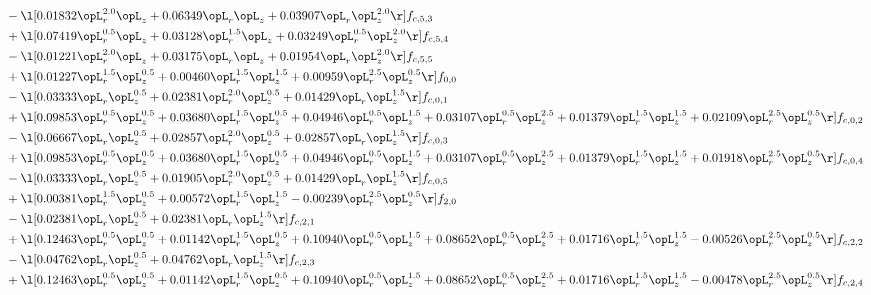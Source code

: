 \begin{alignat}{2}
& - \l[  0.01832 \opL_r^{2.0} \opL_z +  0.06349 \opL_r \opL_z +  0.03907 \opL_r \opL_z^{2.0}  \r] f_{c,5,3} \nonumber \\ 
& + \l[  0.07419 \opL_r^{0.5} \opL_z +  0.03128 \opL_r^{1.5} \opL_z +  0.03249 \opL_r^{0.5} \opL_z^{2.0}  \r] f_{c,5,4} \nonumber \\ 
& - \l[  0.01221 \opL_r^{2.0} \opL_z +  0.03175 \opL_r \opL_z +  0.01954 \opL_r \opL_z^{2.0}  \r] f_{c,5,5} \nonumber \\ 
& + \l[  0.01227 \opL_r^{1.5} \opL_z^{0.5} +  0.00460 \opL_r^{1.5} \opL_z^{1.5} +  0.00959 \opL_r^{2.5} \opL_z^{0.5}  \r] f_{0,0} \nonumber \\ 
& - \l[  0.03333 \opL_r \opL_z^{0.5} +  0.02381 \opL_r^{2.0} \opL_z^{0.5} +  0.01429 \opL_r \opL_z^{1.5}  \r] f_{c,0,1} \nonumber \\ 
& + \l[  0.09853 \opL_r^{0.5} \opL_z^{0.5} +  0.03680 \opL_r^{1.5} \opL_z^{0.5} +  0.04946 \opL_r^{0.5} \opL_z^{1.5} +  0.03107 \opL_r^{0.5} \opL_z^{2.5} +  0.01379 \opL_r^{1.5} \opL_z^{1.5} +  0.02109 \opL_r^{2.5} \opL_z^{0.5}  \r] f_{c,0,2} \nonumber \\ 
& - \l[  0.06667 \opL_r \opL_z^{0.5} +  0.02857 \opL_r^{2.0} \opL_z^{0.5} +  0.02857 \opL_r \opL_z^{1.5}  \r] f_{c,0,3} \nonumber \\ 
& + \l[  0.09853 \opL_r^{0.5} \opL_z^{0.5} +  0.03680 \opL_r^{1.5} \opL_z^{0.5} +  0.04946 \opL_r^{0.5} \opL_z^{1.5} +  0.03107 \opL_r^{0.5} \opL_z^{2.5} +  0.01379 \opL_r^{1.5} \opL_z^{1.5} +  0.01918 \opL_r^{2.5} \opL_z^{0.5}  \r] f_{c,0,4} \nonumber \\ 
& - \l[  0.03333 \opL_r \opL_z^{0.5} +  0.01905 \opL_r^{2.0} \opL_z^{0.5} +  0.01429 \opL_r \opL_z^{1.5}  \r] f_{c,0,5} \nonumber \\ 
& + \l[  0.00381 \opL_r^{1.5} \opL_z^{0.5} +  0.00572 \opL_r^{1.5} \opL_z^{1.5}   -0.00239 \opL_r^{2.5} \opL_z^{0.5}  \r] f_{2,0} \nonumber \\ 
& - \l[  0.02381 \opL_r \opL_z^{0.5} +  0.02381 \opL_r \opL_z^{1.5}  \r] f_{c,2,1} \nonumber \\ 
& + \l[  0.12463 \opL_r^{0.5} \opL_z^{0.5} +  0.01142 \opL_r^{1.5} \opL_z^{0.5} +  0.10940 \opL_r^{0.5} \opL_z^{1.5} +  0.08652 \opL_r^{0.5} \opL_z^{2.5} +  0.01716 \opL_r^{1.5} \opL_z^{1.5}   -0.00526 \opL_r^{2.5} \opL_z^{0.5}  \r] f_{c,2,2} \nonumber \\ 
& - \l[  0.04762 \opL_r \opL_z^{0.5} +  0.04762 \opL_r \opL_z^{1.5}  \r] f_{c,2,3} \nonumber \\ 
& + \l[  0.12463 \opL_r^{0.5} \opL_z^{0.5} +  0.01142 \opL_r^{1.5} \opL_z^{0.5} +  0.10940 \opL_r^{0.5} \opL_z^{1.5} +  0.08652 \opL_r^{0.5} \opL_z^{2.5} +  0.01716 \opL_r^{1.5} \opL_z^{1.5}   -0.00478 \opL_r^{2.5} \opL_z^{0.5}  \r] f_{c,2,4} \nonumber \\ 

\end{alignat}
